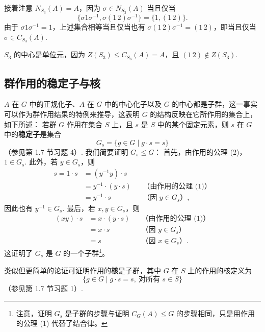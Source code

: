 \begin{example}
\begin{enumerate}[label=(\arabic*)]
接着注意 \( N_{S_3}(A) = A \)，因为 \( \sigma \in N_{S_3}(A) \) 当且仅当
\[
\{\sigma 1\sigma^{-1}, \sigma (1\,2)\sigma^{-1}\} = \{1, (1\,2)\}.
\]
由于 \( \sigma 1\sigma^{-1} = 1 \)，上述集合相等当且仅当也有 \( \sigma (1\,2)\sigma^{-1} = (1\,2) \)，即当且仅当 \( \sigma \in C_{S_3}(A) \).

\( S_3 \) 的中心是单位元，因为 \( Z(S_3) \leq C_{S_3}(A) = A \)，且 \( (1\,2) \notin Z(S_3) \).
\end{enumerate}
\end{example}

\subsection*{群作用的稳定子与核}

\( A \) 在 \( G \) 中的正规化子、\( A \) 在 \( G \) 中的中心化子以及 \( G \) 的中心都是子群，这一事实可以作为群作用结果的特例来推导，这表明 \( G \) 的结构反映在它所作用的集合上，如下所述：
若群 \( G \) 作用在集合 \( S \) 上，且 \( s \) 是 \( S \) 中的某个固定元素，则 \( s \) 在 \( G \) 中的\textbf{稳定子}是集合
\[
G_s = \{ g \in G \mid g \cdot s = s \}
\]
（参见第 1.7 节习题 4）. 
我们简要证明 \( G_s \leq G \)：
首先，由作用的公理 (2)，\( 1 \in G_s \). 
此外，若 \( y \in G_s \)，则
\[
\begin{aligned}
s = 1 \cdot s &= (y^{-1}y) \cdot s \\
&= y^{-1} \cdot (y \cdot s) && \text{（由作用的公理 (1)）} \\
&= y^{-1} \cdot s && \text{（因 } y \in G_s\text{）},
\end{aligned}
\]
因此也有 \( y^{-1} \in G_s \). 
最后，若 \( x, y \in G_s \)，则
\[
\begin{aligned}
(xy) \cdot s &= x \cdot (y \cdot s) && \text{（由作用的公理 (1)）} \\
&= x \cdot s && \text{（因 } y \in G_s\text{）} \\
&= s && \text{（因 } x \in G_s\text{）}.
\end{aligned}
\]
这证明了 \( G_s \) 是 \( G \) 的一个子群\footnote{注意，证明 \( G_s \) 是子群的步骤与证明 \( C_G(A) \leq G \) 的步骤相同，只是用作用的公理 (1) 代替了结合律。}。

类似但更简单的论证可证明作用的\textbf{核}是子群，其中 \( G \) 在 \( S \) 上的作用的核定义为
\[
\{ g \in G \mid g \cdot s = s,\ \text{对所有 } s \in S \}
\]
（参见第 1.7 节习题 1）.

